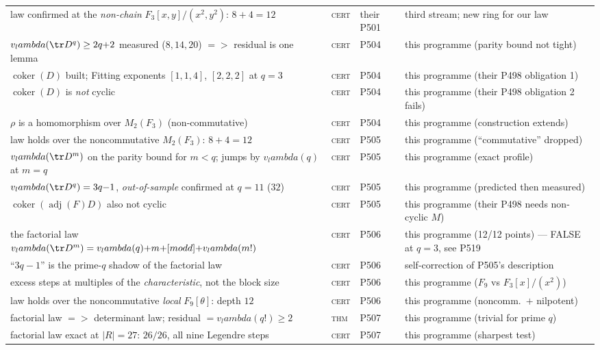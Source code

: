 \documentclass[12pt,a4paper]{article}
\def\mathbb#1{#1}%
\def\textbf#1{#1}%
\def\text#1{#1}%
\def\lambda{lambda}%
\def\Rightarrow{ => }%
\theoremstyle{definition}
\newcommand{\FF}{\mathbb{F}}
\begin{document}
\begin{center}
\begin{tabular}{@{}p{}llp{}@{}}
law confirmed at the \emph{non-chain} $\FF_3[x,y]/(x^2,y^2)$: $8{+}4=12$ & \textsc{cert} & their P501 & third stream; new ring for our law \\
$v_\lambda(\tr D^q)\ge2q{+}2$ measured ($8,14,20$) $\Rightarrow$ residual is one lemma & \textsc{cert} & P504 & this programme (parity bound not tight) \\
$\operatorname{coker}(D)$ built; Fitting exponents $[1,1,4]$, $[2,2,2]$ at $q{=}3$ & \textsc{cert} & P504 & this programme (their P498 obligation 1) \\
$\operatorname{coker}(D)$ is \emph{not} cyclic & \textsc{cert} & P504 & this programme (their P498 obligation 2 fails) \\
$\rho$ is a homomorphism over $M_2(\FF_3)$ (non-commutative) & \textsc{cert} & P504 & this programme (construction extends) \\
\textbf{law holds over the noncommutative $M_2(\FF_3)$: $8{+}4=12$} & \textsc{cert} & P505 & this programme (``commutative'' dropped) \\
$v_\lambda(\tr D^m)$ on the parity bound for $m<q$; jumps by $v_\lambda(q)$ at $m{=}q$ & \textsc{cert} & P505 & this programme (exact profile) \\
$v_\lambda(\tr D^q)=3q{-}1$, \emph{out-of-sample} confirmed at $q{=}11$ ($32$) & \textsc{cert} & P505 & this programme (predicted then measured) \\
$\operatorname{coker}(\operatorname{adj}(F)D)$ also not cyclic & \textsc{cert} & P505 & this programme (their P498 needs non-cyclic $M$) \\
\textbf{the factorial law} $v_\lambda(\tr D^m)=v_\lambda(q){+}m{+}[m\text{ odd}]{+}v_\lambda(m!)$ & \textsc{cert} & P506 & this programme (12/12 points) --- \textbf{FALSE at $q{=}3$, see P519} \\
``$3q{-}1$'' is the prime-$q$ shadow of the factorial law & \textsc{cert} & P506 & self-correction of P505's description \\
excess steps at multiples of the \emph{characteristic}, not the block size & \textsc{cert} & P506 & this programme ($\FF_9$ vs $\FF_3[x]/(x^2)$) \\
law holds over the noncommutative \emph{local} $\FF_9[\theta]$: depth $12$ & \textsc{cert} & P506 & this programme (noncomm.\ $+$ nilpotent) \\
\textbf{factorial law $\Rightarrow$ determinant law}; residual $=v_\lambda(q!)\ge2$ & \textsc{thm} & P507 & this programme (trivial for prime $q$) \\
factorial law exact at $|R|{=}27$: $26/26$, all nine Legendre steps & \textsc{cert} & P507 & this programme (sharpest test) \\

\end{tabular}
\end{center}
\end{document}
